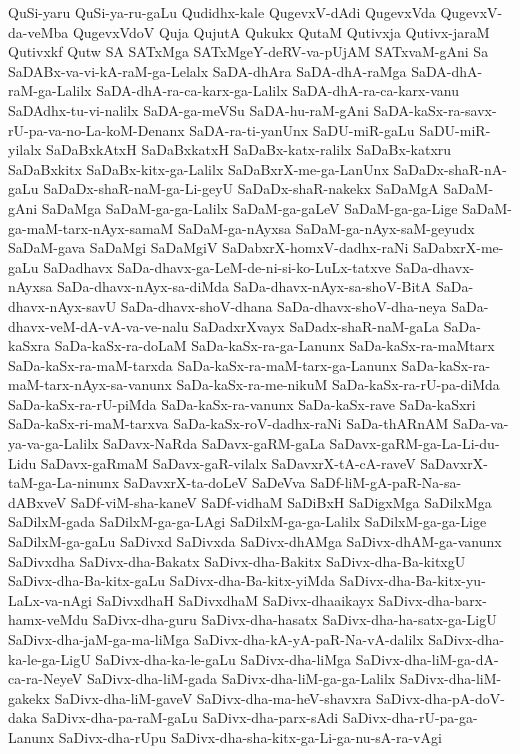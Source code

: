 {QuSi-yaru
QuSi-ya-ru-gaLu
Qudidhx-kale
QugevxV-dAdi
QugevxVda
QugevxV-da-veMba
QugevxVdoV
Quja
QujutA
Qukukx
QutaM
Qutivxja
Qutivx-jaraM
Qutivxkf
Qutw
SA
SATxMga
SATxMgeY-deRV-va-pUjAM
SATxvaM-gAni
Sa
SaDABx-va-vi-kA-raM-ga-Lelalx
SaDA-dhAra
SaDA-dhA-raMga
SaDA-dhA-raM-ga-Lalilx
SaDA-dhA-ra-ca-karx-ga-Lalilx
SaDA-dhA-ra-ca-karx-vanu
SaDAdhx-tu-vi-nalilx
SaDA-ga-meVSu
SaDA-hu-raM-gAni
SaDA-kaSx-ra-savx-rU-pa-va-no-La-koM-Denanx
SaDA-ra-ti-yanUnx
SaDU-miR-gaLu
SaDU-miR-yilalx
SaDaBxkAtxH
SaDaBxkatxH
SaDaBx-katx-ralilx
SaDaBx-katxru
SaDaBxkitx
SaDaBx-kitx-ga-Lalilx
SaDaBxrX-me-ga-LanUnx
SaDaDx-shaR-nA-gaLu
SaDaDx-shaR-naM-ga-Li-geyU
SaDaDx-shaR-nakekx
SaDaMgA
SaDaM-gAni
SaDaMga
SaDaM-ga-ga-Lalilx
SaDaM-ga-gaLeV
SaDaM-ga-ga-Lige
SaDaM-ga-maM-tarx-nAyx-samaM
SaDaM-ga-nAyxsa
SaDaM-ga-nAyx-saM-geyudx
SaDaM-gava
SaDaMgi
SaDaMgiV
SaDabxrX-homxV-dadhx-raNi
SaDabxrX-me-gaLu
SaDadhavx
SaDa-dhavx-ga-LeM-de-ni-si-ko-LuLx-tatxve
SaDa-dhavx-nAyxsa
SaDa-dhavx-nAyx-sa-diMda
SaDa-dhavx-nAyx-sa-shoV-BitA
SaDa-dhavx-nAyx-savU
SaDa-dhavx-shoV-dhana
SaDa-dhavx-shoV-dha-neya
SaDa-dhavx-veM-dA-vA-va-ve-nalu
SaDadxrXvayx
SaDadx-shaR-naM-gaLa
SaDa-kaSxra
SaDa-kaSx-ra-doLaM
SaDa-kaSx-ra-ga-Lanunx
SaDa-kaSx-ra-maMtarx
SaDa-kaSx-ra-maM-tarxda
SaDa-kaSx-ra-maM-tarx-ga-Lanunx
SaDa-kaSx-ra-maM-tarx-nAyx-sa-vanunx
SaDa-kaSx-ra-me-nikuM
SaDa-kaSx-ra-rU-pa-diMda
SaDa-kaSx-ra-rU-piMda
SaDa-kaSx-ra-vanunx
SaDa-kaSx-rave
SaDa-kaSxri
SaDa-kaSx-ri-maM-tarxva
SaDa-kaSx-roV-dadhx-raNi
SaDa-thARnAM
SaDa-va-ya-va-ga-Lalilx
SaDavx-NaRda
SaDavx-gaRM-gaLa
SaDavx-gaRM-ga-La-Li-du-Lidu
SaDavx-gaRmaM
SaDavx-gaR-vilalx
SaDavxrX-tA-cA-raveV
SaDavxrX-taM-ga-La-ninunx
SaDavxrX-ta-doLeV
SaDeVva
SaDf-liM-gA-paR-Na-sa-dABxveV
SaDf-viM-sha-kaneV
SaDf-vidhaM
SaDiBxH
SaDigxMga
SaDilxMga
SaDilxM-gada
SaDilxM-ga-ga-LAgi
SaDilxM-ga-ga-Lalilx
SaDilxM-ga-ga-Lige
SaDilxM-ga-gaLu
SaDivxd
SaDivxda
SaDivx-dhAMga
SaDivx-dhAM-ga-vanunx
SaDivxdha
SaDivx-dha-Bakatx
SaDivx-dha-Bakitx
SaDivx-dha-Ba-kitxgU
SaDivx-dha-Ba-kitx-gaLu
SaDivx-dha-Ba-kitx-yiMda
SaDivx-dha-Ba-kitx-yu-LaLx-va-nAgi
SaDivxdhaH
SaDivxdhaM
SaDivx-dhaaikayx
SaDivx-dha-barx-hamx-veMdu
SaDivx-dha-guru
SaDivx-dha-hasatx
SaDivx-dha-ha-satx-ga-LigU
SaDivx-dha-jaM-ga-ma-liMga
SaDivx-dha-kA-yA-paR-Na-vA-dalilx
SaDivx-dha-ka-le-ga-LigU
SaDivx-dha-ka-le-gaLu
SaDivx-dha-liMga
SaDivx-dha-liM-ga-dA-ca-ra-NeyeV
SaDivx-dha-liM-gada
SaDivx-dha-liM-ga-ga-Lalilx
SaDivx-dha-liM-gakekx
SaDivx-dha-liM-gaveV
SaDivx-dha-ma-heV-shavxra
SaDivx-dha-pA-doV-daka
SaDivx-dha-pa-raM-gaLu
SaDivx-dha-parx-sAdi
SaDivx-dha-rU-pa-ga-Lanunx
SaDivx-dha-rUpu
SaDivx-dha-sha-kitx-ga-Li-ga-nu-sA-ra-vAgi
}
